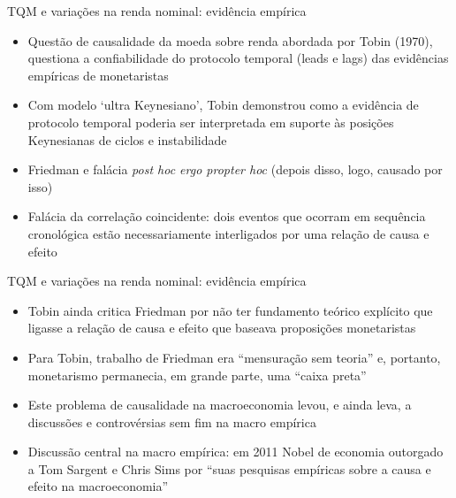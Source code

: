 \documentclass[10pt]{beamer}
\begin{document}
\begin{frame}{TQM e variações na renda nominal: evidência empírica}
    \begin{itemize}
        \item Questão de causalidade da moeda sobre renda abordada por Tobin (1970), questiona a confiabilidade do protocolo temporal (leads e lags) das evidências empíricas de monetaristas
        \bigskip
        \item Com modelo `ultra Keynesiano', Tobin demonstrou como a evidência de protocolo temporal poderia ser interpretada em suporte às posições Keynesianas de ciclos e instabilidade
        \bigskip
        \item Friedman e falácia \emph{post hoc ergo propter hoc} (depois disso, logo, causado por isso)
        \bigskip
        \item Falácia da correlação coincidente: dois eventos que ocorram em sequência cronológica estão necessariamente interligados por uma relação de causa e efeito
    \end{itemize}
\end{frame}

\begin{frame}{TQM e variações na renda nominal: evidência empírica}
    \begin{itemize}
        \item Tobin ainda critica Friedman por não ter fundamento teórico explícito que ligasse a relação de causa e efeito que baseava proposições monetaristas
        \bigskip
        \item Para Tobin, trabalho de Friedman era ``mensuração sem teoria'' e, portanto, monetarismo permanecia, em grande parte, uma ``caixa preta''
        \bigskip
        \item Este problema de causalidade na macroeconomia levou, e ainda leva, a discussões e controvérsias sem fim na macro empírica
        \bigskip
        \item Discussão central na macro empírica: em 2011 Nobel de economia outorgado a Tom Sargent e Chris Sims por ``suas pesquisas empíricas sobre a causa e efeito na macroeconomia''
    \end{itemize}
\end{frame}
\end{document}
